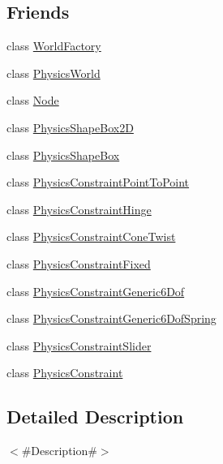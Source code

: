 \subsection*{Friends}
\begin{DoxyCompactItemize}
\item 
class \mbox{\hyperlink{classnjli_1_1_physics_body_acb96ebb09abe8f2a37a915a842babfac}{World\+Factory}}
\item 
class \mbox{\hyperlink{classnjli_1_1_physics_body_abd7959b8cbcd7c25bc6c0c8b1ea26ce6}{Physics\+World}}
\item 
class \mbox{\hyperlink{classnjli_1_1_physics_body_a6db9d28bd448a131448276ee03de1e6d}{Node}}
\item 
class \mbox{\hyperlink{classnjli_1_1_physics_body_ae9fdb8cf9943dbfd76910301cb0ac1bc}{Physics\+Shape\+Box2D}}
\item 
class \mbox{\hyperlink{classnjli_1_1_physics_body_aa594c185e502e1b87c998e01dd17a50f}{Physics\+Shape\+Box}}
\item 
class \mbox{\hyperlink{classnjli_1_1_physics_body_a06afcd7f1b1822af8e15e045e77eed2a}{Physics\+Constraint\+Point\+To\+Point}}
\item 
class \mbox{\hyperlink{classnjli_1_1_physics_body_a0117dac2d3ca1ac4ebe089ac8c258560}{Physics\+Constraint\+Hinge}}
\item 
class \mbox{\hyperlink{classnjli_1_1_physics_body_a2ccf10571ac5c97189a4c7d1fe3831ae}{Physics\+Constraint\+Cone\+Twist}}
\item 
class \mbox{\hyperlink{classnjli_1_1_physics_body_a684f5ece6d7d44c2b9f689e76458a8fb}{Physics\+Constraint\+Fixed}}
\item 
class \mbox{\hyperlink{classnjli_1_1_physics_body_a1d2185bf07a23cc48cd8f9d4271f3e39}{Physics\+Constraint\+Generic6\+Dof}}
\item 
class \mbox{\hyperlink{classnjli_1_1_physics_body_af32c447e4cf588410ecc1a6106157f9a}{Physics\+Constraint\+Generic6\+Dof\+Spring}}
\item 
class \mbox{\hyperlink{classnjli_1_1_physics_body_a6b9fa11eb22d1cb30e2d4fc2247e9afa}{Physics\+Constraint\+Slider}}
\item 
class \mbox{\hyperlink{classnjli_1_1_physics_body_aa59c958a66870f0d251ec0dd477d2eff}{Physics\+Constraint}}
\end{DoxyCompactItemize}


\subsection{Detailed Description}
$<$\#\+Description\#$>$ 

